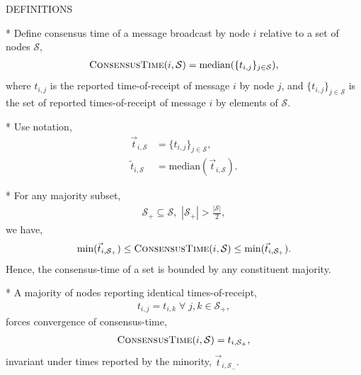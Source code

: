 DEFINITIONS

* Define consensus time of a message broadcast by node $i$ relative to a set of nodes $\mathcal{S}$,
\begin{align}
	\textsc{ConsensusTime}(i,\mathcal{S}) = \mathrm{median}(\{t_{i,j}\}_{j\in\mathcal{S}}),
\end{align}
where $t_{i,j}$ is the reported time-of-receipt of message $i$ by node $j$, and $\{t_{i,j}\}_{j\in\mathcal{S}}$ is the set of reported times-of-receipt of message $i$ by elements of $\mathcal{S}$. 

* Use notation,
\begin{align}
\vec{t}_{i,\mathcal{S}} &= \{t_{i,j}\}_{j\in\mathcal{S}},\nonumber\\
\tilde{t}_{i,\mathcal{S}} &= \mathrm{median}(\vec{t}_{i,\mathcal{S}}).
\end{align}

* For any majority subset,
\begin{align}
	\mathcal{S}_+\subseteq\mathcal{S},\,\,|\mathcal{S}_+|>\frac{|\mathcal{S}|}{2},
\end{align}
we have,
\begin{align}
	\mathrm{min}(\vec{t}_{i,\mathcal{S}_+}) \leq \textsc{ConsensusTime}(i,\mathcal{S}) \leq \mathrm{min}(\vec{t}_{i,\mathcal{S}_+}).
\end{align}
Hence, the consensus-time of a set is bounded by any constituent majority.

* A majority of nodes reporting identical times-of-receipt,
\begin{align}
 	t_{i,j}=t_{i,k} \;\forall\; j,k\in\mathcal{S}_+,
\end{align}
forces convergence of consensus-time,
\begin{align} \label{eq:ct_converge}
	\textsc{ConsensusTime}(i,\mathcal{S}) = t_{i,\mathcal{S}_+},
\end{align}
invariant under times reported by the minority, $\vec{t}_{i,\mathcal{S}_-}$.

